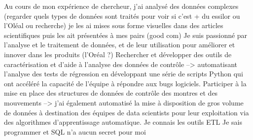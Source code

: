 \documentclass[11pt, a4paper]{awesome-cv}
\begin{document}
\begin{cvletter}
Au cours de mon expérience de chercheur, j'ai analysé des données complexes (regarder quels types de données sont traités pour voir si c'est + du essilor ou l'Oléal ou recherche)
je les ai mises sous forme visuelles dans des articles scientifiques puis les ait présentées à mes pairs (good com)
Je suis passionné par l'analyse et le traitement de données, et de leur utilisation pour améliorer et innover dans les produits (l'Oréal ?)
Rechercher et développer des outils de caractérisation et d’aide à l’analyse des données de contrôle -->  automatisant l'analyse des tests de régression en développant une série de scripts Python qui ont accéléré la capacité de l'équipe à répondre aux bugs logiciels.
Participer à la mise en place des structures de données de contrôle des montres et des mouvements --> j'ai également automatisé la mise à disposition de gros volume de données à destination des équipes de data scientists pour leur exploitation via des algorithmes d’apprentissage automatique.
Je connais les outils ETL
Je sais programmer et SQL n'a aucun secret pour moi 


\end{cvletter}
\end{document}
